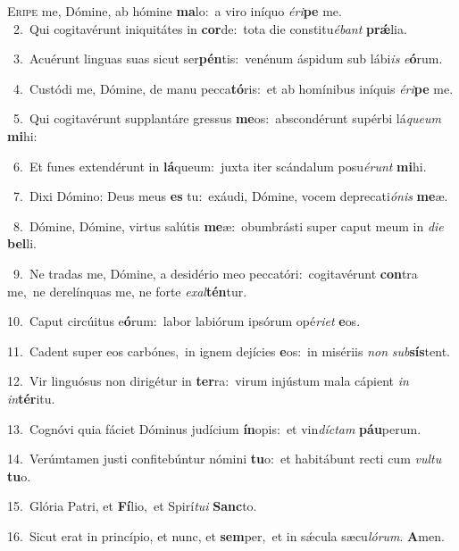 \lettrine{\initial\textcolor{\initialcolor}{E}}{ripe} me, Dómine, ab hómine \textbf{ma}\-lo:~\star a viro iníquo \textit{é}\-\textit{ri}\textbf{pe} me.\\
{\numbfont\textcolor{\numbcolor}{~2.}}~Qui cogitavérunt iniquitátes in \textbf{cor}\-de:~\star tota die constitu\-\textit{é}\-\textit{bant} \textbf{prǽ}\-lia.\par
{\numbfont\textcolor{\numbcolor}{~3.}}~Acuérunt linguas suas sicut ser\-\textbf{pén}\-tis:~\star venénum áspidum sub lábi\textit{is} \textit{e}\-\textbf{ó}rum.\par
{\numbfont\textcolor{\numbcolor}{~4.}}~Custódi me, Dómine, de manu pecca\-\textbf{tó}\-ris:~\star et ab homínibus iníquis \textit{é}\-\textit{ri}\textbf{pe} me.\par
{\numbfont\textcolor{\numbcolor}{~5.}}~Qui cogitavérunt supplantáre gressus \textbf{me}\-os:~\star abscondérunt supérbi lá\-\textit{que}\-\textit{um} \textbf{mi}\-hi:\par
{\numbfont\textcolor{\numbcolor}{~6.}}~Et funes extendérunt in \textbf{lá}\-queum:~\star juxta iter scándalum posu\-\textit{é}\-\textit{runt} \textbf{mi}\-hi.\par
{\numbfont\textcolor{\numbcolor}{~7.}}~Dixi Dómino: Deus meus \textbf{es} tu:~\star exáudi, Dómine, vocem deprecati\-\textit{ó}\-\textit{nis} \textbf{me}\-æ.\par
{\numbfont\textcolor{\numbcolor}{~8.}}~Dómine, Dómine, virtus salútis \textbf{me}\-æ:~\star obumbrásti super caput meum in \textit{di}\-\textit{e} \textbf{bel}\-li.\par
{\numbfont\textcolor{\numbcolor}{~9.}}~Ne tradas me, Dómine, a desidério meo peccatóri:~\dagger cogitavérunt \textbf{con}\-tra me,~\star ne derelínquas me, ne forte \textit{ex}\-\textit{al}\textbf{tén}tur.\par
{\numbfont\textcolor{\numbcolor}{10.}}~Caput circúitus e\-\textbf{ó}\-rum:~\star labor labiórum ipsórum opé\-\textit{ri}\-\textit{et} \textbf{e}\-os.\par
{\numbfont\textcolor{\numbcolor}{11.}}~Cadent super eos carbónes,~\dagger in ignem dejícies \textbf{e}\-os:~\star in misériis \textit{non} \textit{sub}\-\textbf{sís}tent.\par
{\numbfont\textcolor{\numbcolor}{12.}}~Vir linguósus non dirigétur in \textbf{ter}\-ra:~\star virum injústum mala cápient \textit{in} \textit{in}\-\textbf{tér}itu.\par
{\numbfont\textcolor{\numbcolor}{13.}}~Cognóvi quia fáciet Dóminus judícium \textbf{ín}\-opis:~\star et vin\-\textit{díc}\-\textit{tam} \textbf{páu}\-perum.\par
{\numbfont\textcolor{\numbcolor}{14.}}~Verúmtamen justi confitebúntur nómini \textbf{tu}\-o:~\star et habitábunt recti cum \textit{vul}\-\textit{tu} \textbf{tu}\-o.\par
{\numbfont\textcolor{\numbcolor}{15.}}~Glória Patri, et \textbf{Fí}\-lio,~\star et Spirí\-\textit{tu}\-\textit{i} \textbf{Sanc}\-to.\par
{\numbfont\textcolor{\numbcolor}{16.}}~Sicut erat in princípio, et nunc, et \textbf{sem}\-per,~\star et in sǽcula sæcu\-\textit{ló}\-\textit{rum}. \textbf{A}\-men.\par
